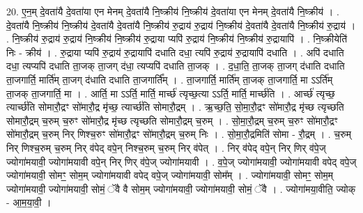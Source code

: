 \documentclass[17pt]{extarticle}
\begin{document}
20. ए॒न॒म् दे॒वता॑यै दे॒वता॑या एन मेनम् दे॒वता॑यै नि॒ष्क्रीय॑ नि॒ष्क्रीय॑ दे॒वता॑या एन मेनम् दे॒वता॑यै नि॒ष्क्रीय॑ । . दे॒वता॑यै नि॒ष्क्रीय॑ नि॒ष्क्रीय॑ दे॒वता॑यै दे॒वता॑यै नि॒ष्क्रीय॑ रु॒द्राय॑ रु॒द्राय॑ नि॒ष्क्रीय॑ दे॒वता॑यै दे॒वता॑यै नि॒ष्क्रीय॑ रु॒द्राय॑ । . नि॒ष्क्रीय॑ रु॒द्राय॑ रु॒द्राय॑ नि॒ष्क्रीय॑ नि॒ष्क्रीय॑ रु॒द्राया प्यपि॑ रु॒द्राय॑ नि॒ष्क्रीय॑ नि॒ष्क्रीय॑ रु॒द्रायापि॑ । . नि॒ष्क्रीयेति॑ निः - क्रीय॑ । . रु॒द्राया प्यपि॑ रु॒द्राय॑ रु॒द्रायापि॑ दधाति दधा॒ त्यपि॑ रु॒द्राय॑ रु॒द्रायापि॑ दधाति । . अपि॑ दधाति दधा॒ त्यप्यपि॑ दधाति ता॒जक् ता॒जग् द॑धा॒ त्यप्यपि॑ दधाति ता॒जक् । . द॒धा॒ति॒ ता॒जक् ता॒जग् द॑धाति दधाति ता॒जगार्ति॒ मार्ति॑म् ता॒जग् द॑धाति दधाति ता॒जगार्ति᳚म् । . ता॒जगार्ति॒ मार्ति॑म् ता॒जक् ता॒जगार्ति॒ मा ऽऽर्ति॑म् ता॒जक् ता॒जगार्ति॒ मा । . आर्ति॒ मा ऽऽर्ति॒ मार्ति॒ मार्च्छ॑ त्यृच्छ॒त्या ऽऽर्ति॒ मार्ति॒ मार्च्छ॑ति । . आर्च्छ॑ त्यृच्छ॒ त्यार्च्छ॑ति सोमारौ॒द्रꣳ सो॑मारौ॒द्र मृ॑च्छ॒ त्यार्च्छ॑ति सोमारौ॒द्रम् । . ऋ॒च्छ॒ति॒ सो॒मा॒रौ॒द्रꣳ सो॑मारौ॒द्र मृ॑च्छ त्यृच्छति सोमारौ॒द्रम् च॒रुम् च॒रुꣳ सो॑मारौ॒द्र मृ॑च्छ त्यृच्छति सोमारौ॒द्रम् च॒रुम् । . सो॒मा॒रौ॒द्रम् च॒रुम् च॒रुꣳ सो॑मारौ॒द्रꣳ सो॑मारौ॒द्रम् च॒रुम् निर् णिश्च॒रुꣳ सो॑मारौ॒द्रꣳ सो॑मारौ॒द्रम् च॒रुम् निः । . सो॒मा॒रौ॒द्रमिति॑ सोमा - रौ॒द्रम् । . च॒रुम् निर् णिश्च॒रुम् च॒रुम् निर् व॑पेद् वपे॒न् निश्च॒रुम् च॒रुम् निर् व॑पेत् । . निर् व॑पेद् वपे॒न् निर् णिर् व॑पे॒ज् ज्योगा॑मयावी॒ ज्योगा॑मयावी वपे॒न् निर् णिर् व॑पे॒ज् ज्योगा॑मयावी । . व॒पे॒ज् ज्योगा॑मयावी॒ ज्योगा॑मयावी वपेद् वपे॒ज् ज्योगा॑मयावी॒ सोमꣳ॒॒ सोम॒म् ज्योगा॑मयावी वपेद् वपे॒ज् ज्योगा॑मयावी॒ सोम᳚म् । . ज्योगा॑मयावी॒ सोमꣳ॒॒ सोम॒म् ज्योगा॑मयावी॒ ज्योगा॑मयावी॒ सोमं॒ ॅवै वै सोम॒म् ज्योगा॑मयावी॒ ज्योगा॑मयावी॒ सोमं॒ ॅवै । . ज्योगा॑मया॒वीति॒ ज्योक् - आ॒म॒या॒वी॒ । \newline
\end{document}
